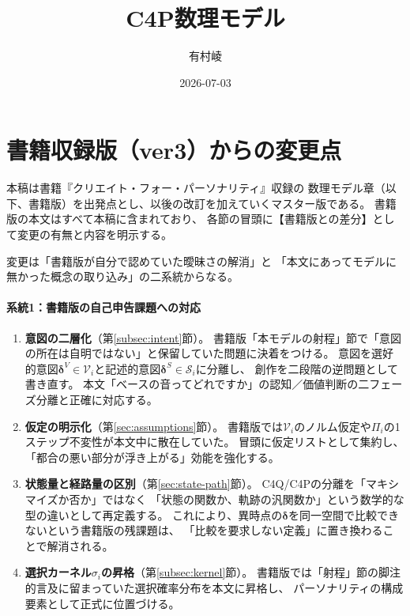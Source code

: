 \documentclass[a4paper, fontsize=10pt]{jlreq}
\title{C4P数理モデル}
\author{有村崚}
\date{2026-07-03}
\newcommand{\Si}{\mathcal{S}_i}
\newcommand{\Vi}{\mathcal{V}_i}
\newcommand{\dV}{\bm{\delta}^{V}}          %
\newcommand{\dS}{\bm{\delta}^{S}}          %
\newcounter{assumption}
\begin{document}
\maketitle

\section*{書籍収録版（ver3）からの変更点}

本稿は書籍『クリエイト・フォー・パーソナリティ』収録の
数理モデル章（以下、書籍版）を出発点とし、以後の改訂を加えていくマスター版である。
書籍版の本文はすべて本稿に含まれており、
各節の冒頭に【書籍版との差分】として変更の有無と内容を明示する。

変更は「書籍版が自分で認めていた曖昧さの解消」と
「本文にあってモデルに無かった概念の取り込み」の二系統からなる。

\paragraph{系統1：書籍版の自己申告課題への対応}
\begin{enumerate}[leftmargin=2em]
  \item \textbf{意図の二層化}（第\ref{subsec:intent}節）。
    書籍版「本モデルの射程」節で「意図の所在は自明ではない」と保留していた問題に決着をつける。
    意図を選好的意図$\dV \in \Vi$と記述的意図$\dS \in \Si$に分離し、
    創作を二段階の逆問題として書き直す。
    本文「ベースの音ってどれですか」の認知／価値判断の二フェーズ分離と正確に対応する。
  \item \textbf{仮定の明示化}（第\ref{sec:assumptions}節）。
    書籍版では$\Vi$のノルム仮定や$\Pi_i$の1ステップ不変性が本文中に散在していた。
    冒頭に仮定リストとして集約し、「都合の悪い部分が浮き上がる」効能を強化する。
  \item \textbf{状態量と経路量の区別}（第\ref{sec:state-path}節）。
    C4Q/C4Pの分離を「マキシマイズか否か」ではなく
    「状態の関数か、軌跡の汎関数か」という数学的な型の違いとして再定義する。
    これにより、異時点の$\bm{\delta}$を同一空間で比較できないという書籍版の残課題は、
    「比較を要求しない定義」に置き換わることで解消される。
  \item \textbf{選択カーネル$\sigma_i$の昇格}（第\ref{subsec:kernel}節）。
    書籍版では「射程」節の脚注的言及に留まっていた選択確率分布を本文に昇格し、
    パーソナリティの構成要素として正式に位置づける。
\end{enumerate}
\end{document}
